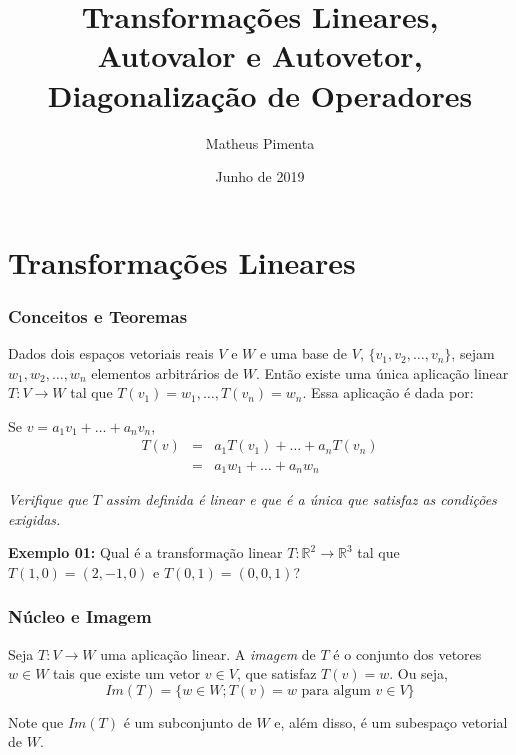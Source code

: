 \documentclass[hyperref={pdfpagelabels=false}]{beamer}
\title{Transformações Lineares, Autovalor e Autovetor, Diagonalização de Operadores}
\author[Matheus Pimenta]{Matheus Pimenta}
\institute[UTFPR-CP]{\normalsize Universidade Tecnológica Federal do Paraná \\
	Câmpus Cornélio Procópio
}
\date{Junho de 2019}
\begin{document}
	
\begin{frame}
\titlepage
\end{frame} 




\section{Transformações Lineares} 


\begin{frame}
\frametitle{Conceitos e Teoremas} 

	\begin{theorem}
		Dados dois espaços vetoriais reais $V$ e $W$ e uma base de $V$, $\{ v_1, v_2, \dots, v_n \}$, sejam $w_1, w_2, \dots, w_n$ elementos arbitrários de $W$. Então existe uma única aplicação linear $T: V \rightarrow W$ tal que $T(v_1) = w_1, \dots, T(v_n) = w_n$. Essa aplicação é dada por:
		
		Se $v = a_1 v_1 + \dots + a_n v_n$,
		\begin{eqnarray*}
			T(v) & = & a_1 T(v_1) + \dots + a_n T(v_n) \\
			& = & a_1 w_1 + \dots + a_n w_n
		\end{eqnarray*}
		
		\emph{Verifique que $T$ assim definida é linear e que é a única que satisfaz as condições exigidas.}
	\end{theorem}

	{\bf Exemplo 01:} Qual é a transformação linear $T:\mathbb{R}^2 \rightarrow \mathbb{R}^3$ tal que $T(1,0) = (2,-1,0)$ e $T(0,1) = (0,0,1)$?
\end{frame}

\begin{frame}
\frametitle{Núcleo e Imagem}
\begin{definition}
	Seja $T:V \rightarrow W$ uma aplicação linear. A \emph{imagem} de $T$ é o conjunto dos vetores $w \in W$ tais que existe um vetor $v \in V$, que satisfaz $T(v) = w$. Ou seja,
	$$Im(T) = \{ w \in W; T(v) = w \text{ para algum } v \in V  \}$$
	
	Note que $Im(T)$ é um subconjunto de $W$ e, além disso, é um subespaço vetorial de $W$.
\end{definition}



\end{frame}
\end{document}

